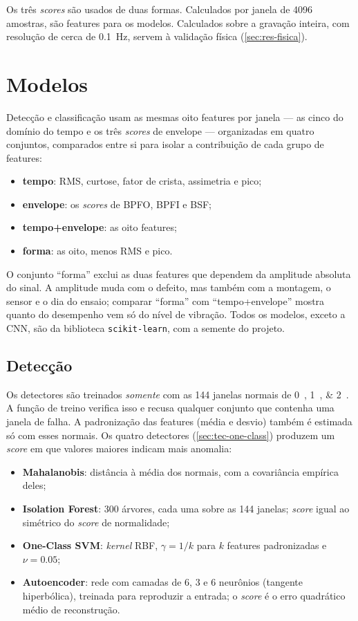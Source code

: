 Os três \emph{scores} são usados de duas formas. Calculados por janela de 4096
amostras, são features para os modelos. Calculados sobre a gravação inteira, com
resolução de cerca de \SI{0.1}{\hertz}, servem à validação física
(\autoref{sec:res-fisica}).

\section{Modelos}
\label{sec:modelos}

Detecção e classificação usam as mesmas oito features por janela --- as cinco do
domínio do tempo e os três \emph{scores} de envelope --- organizadas em quatro
conjuntos, comparados entre si para isolar a contribuição de cada grupo de
features:
\begin{itemize}
  \item \textbf{tempo}: RMS, curtose, fator de crista, assimetria e pico;
  \item \textbf{envelope}: os \emph{scores} de BPFO, BPFI e BSF;
  \item \textbf{tempo+envelope}: as oito features;
  \item \textbf{forma}: as oito, menos RMS e pico.
\end{itemize}
O conjunto ``forma'' exclui as duas features que dependem da amplitude
absoluta do sinal. A amplitude muda com o defeito, mas também com a montagem, o
sensor e o dia do ensaio; comparar ``forma'' com ``tempo+envelope'' mostra quanto
do desempenho vem só do nível de vibração. Todos os modelos, exceto a CNN, são da biblioteca
\texttt{scikit-learn}, com a semente do projeto.

\subsection{Detecção}
\label{sec:met-deteccao}

Os detectores são treinados \emph{somente} com as 144 janelas normais de
\SIlist{0;1;2}{\hp}. A função de treino verifica isso e recusa qualquer conjunto
que contenha uma janela de falha. A padronização das features (média e desvio)
também é estimada só com esses normais. Os quatro detectores
(\autoref{sec:tec-one-class}) produzem um \emph{score} em que valores maiores indicam
mais anomalia:
\begin{itemize}
  \item \textbf{Mahalanobis}: distância à média dos normais, com a covariância
  empírica deles;
  \item \textbf{Isolation Forest}: 300 árvores, cada uma sobre as 144 janelas;
  \emph{score} igual ao simétrico do \emph{score} de normalidade;
  \item \textbf{One-Class SVM}: \emph{kernel} RBF, $\gamma = 1/k$ para $k$ features
  padronizadas e $\nu = \num{0.05}$;
  \item \textbf{Autoencoder}: rede com camadas de 6, 3 e 6 neurônios
  (tangente hiperbólica), treinada para reproduzir a entrada; o \emph{score} é o erro
  quadrático médio de reconstrução.
\end{itemize}

